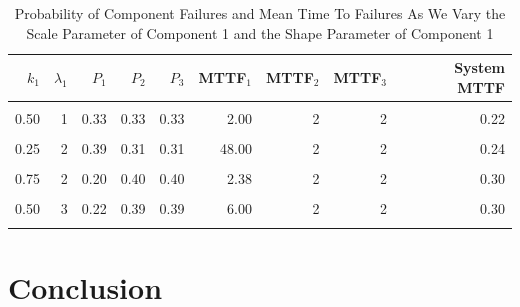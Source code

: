 \documentclass[
]{article}
\begin{document}
\begin{table}

\caption{\label{tab:table-vary-lam-shape}Probability of Component Failures and Mean Time To Failures As We Vary the Scale Parameter of Component 1 and the Shape Parameter of Component 1}
\centering
\begin{tabular}[t]{r|r|r|r|r|r|r|r|r}
\hline
$k_1$ & $\lambda_1$ & $P_1$ & $P_2$ & $P_3$ & MTTF$_1$ & MTTF$_2$ & MTTF$_3$ & System MTTF\\
\hline
\cellcolor{gray!6}{0.25} & \cellcolor{gray!6}{1} & \cellcolor{gray!6}{0.44} & \cellcolor{gray!6}{0.28} & \cellcolor{gray!6}{0.28} & \cellcolor{gray!6}{24.00} & \cellcolor{gray!6}{2} & \cellcolor{gray!6}{2} & \cellcolor{gray!6}{0.21}\\
\hline
0.50 & 1 & 0.33 & 0.33 & 0.33 & 2.00 & 2 & 2 & 0.22\\
\hline
\cellcolor{gray!6}{0.75} & \cellcolor{gray!6}{1} & \cellcolor{gray!6}{0.28} & \cellcolor{gray!6}{0.36} & \cellcolor{gray!6}{0.36} & \cellcolor{gray!6}{1.19} & \cellcolor{gray!6}{2} & \cellcolor{gray!6}{2} & \cellcolor{gray!6}{0.23}\\
\hline
0.25 & 2 & 0.39 & 0.31 & 0.31 & 48.00 & 2 & 2 & 0.24\\
\hline
\cellcolor{gray!6}{0.50} & \cellcolor{gray!6}{2} & \cellcolor{gray!6}{0.26} & \cellcolor{gray!6}{0.37} & \cellcolor{gray!6}{0.37} & \cellcolor{gray!6}{4.00} & \cellcolor{gray!6}{2} & \cellcolor{gray!6}{2} & \cellcolor{gray!6}{0.27}\\
\hline
0.75 & 2 & 0.20 & 0.40 & 0.40 & 2.38 & 2 & 2 & 0.30\\
\hline
\cellcolor{gray!6}{0.25} & \cellcolor{gray!6}{3} & \cellcolor{gray!6}{0.36} & \cellcolor{gray!6}{0.32} & \cellcolor{gray!6}{0.32} & \cellcolor{gray!6}{72.00} & \cellcolor{gray!6}{2} & \cellcolor{gray!6}{2} & \cellcolor{gray!6}{0.25}\\
\hline
0.50 & 3 & 0.22 & 0.39 & 0.39 & 6.00 & 2 & 2 & 0.30\\
\hline
\cellcolor{gray!6}{0.75} & \cellcolor{gray!6}{3} & \cellcolor{gray!6}{0.16} & \cellcolor{gray!6}{0.42} & \cellcolor{gray!6}{0.42} & \cellcolor{gray!6}{3.57} & \cellcolor{gray!6}{2} & \cellcolor{gray!6}{2} & \cellcolor{gray!6}{0.33}\\
\hline
\end{tabular}
\end{table}

\hypertarget{conclusion}{%
\section{Conclusion}\label{conclusion}}
\end{document}
